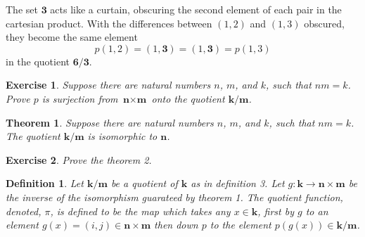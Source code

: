\documentclass{article}
\theoremstyle{problemstyle}
\newtheorem{theorem}{Theorem}
\newtheorem{exercise}{Exercise}
\newtheorem{definition}{Definition}
\begin{document}
The set $\textbf{3}$ acts like a curtain, obscuring the second element of each pair in the cartesian product. With the differences between $(1,2)$ and $(1,3)$ obscured, they become the same element $$p(1,2) = (1, \textbf{3}) = (1, \textbf{3}) = p(1,3)$$ in the quotient $\textbf{6/3}$. 

\begin{exercise}
Suppose there are natural numbers $n$, $m$, and $k$, such that $nm = k$.  Prove $p$ is surjection from $\textbf{n}\times\textbf{m}$ onto the quotient $\textbf{k/m}$. 
\end{exercise}

\begin{theorem}
Suppose there are natural numbers $n$, $m$, and $k$, such that $nm = k$. The quotient $\textbf{k/m}$ is isomorphic to $\textbf{n}$. 
\end{theorem}

\begin{exercise}
Prove the theorem 2.
\end{exercise}

\begin{definition}
Let $\textbf{k/m}$ be a quotient of $\textbf{k}$ as in definition 3. Let $g:\textbf{k} \rightarrow \textbf{n}\times \textbf{m}$ be the inverse of the isomorphism guarateed by theorem 1. The quotient function, denoted, $\pi$, is defined to be the map which takes any $x \in \textbf{k}$, first by $g$ to an element  $g(x) = (i,j) \in \textbf{n}\times\textbf{m}$ then down $p$ to the element $p(g(x)) \in \textbf{k/m}$.

\begin{center}
\end{center}
\end{definition}
\end{document}
